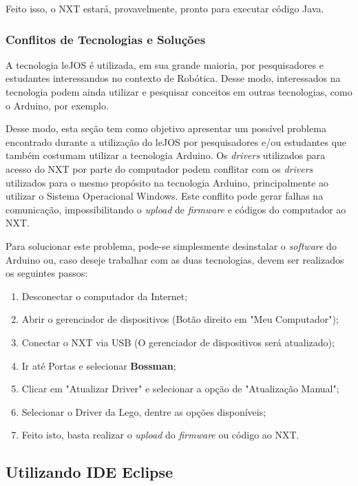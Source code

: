 	Feito isso, o NXT estará, provavelmente, pronto para executar código Java.

\subsubsection{Conflitos de Tecnologias e Soluções}

A tecnologia leJOS é utilizada, em sua grande maioria, por pesquisadores e estudantes interessandos no contexto de Robótica. Desse modo, interessados na tecnologia
podem ainda utilizar e pesquisar conceitos em outras tecnologias, como o Arduino, por exemplo.

Desse modo, esta seção tem como objetivo apresentar um possível problema encontrado durante a utilização do leJOS por pesquisadores e/ou estudantes que também
costumam utilizar a tecnologia Arduino. Os \textit{drivers} utilizados para acesso do NXT por parte do computador podem conflitar com os \textit{drivers} utilizados
para o mesmo propósito na tecnologia Arduino, principalmente ao utilizar o Sistema Operacional Windows. Este conflito pode gerar falhas na comunicação, impossibilitando
o \textit{upload} de \textit{firmware} e códigos do computador ao NXT.

Para solucionar este problema, pode-se simplesmente desinstalar o \textit{software} do Arduino ou, caso deseje trabalhar com as duas tecnologias, devem ser realizados os seguintes passos:

\begin{enumerate}
	\item Desconectar o computador da Internet;
	\item Abrir o gerenciador de dispositivos (Botão direito em "Meu Computador");
	\item Conectar o NXT via USB (O gerenciador de dispositivos será atualizado);
	\item Ir até Portas e selecionar \textbf{Bossman};
	\item Clicar em "Atualizar Driver" e selecionar a opção de "Atualização Manual";
	\item Selecionar o Driver da Lego, dentre as opções disponíveis;
	\item Feito isto, basta realizar o \textit{upload} do \textit{firmware} ou código ao NXT.
\end{enumerate}


\subsection{Utilizando IDE Eclipse} %
\label{sub:utilizando_ide_eclipse}


